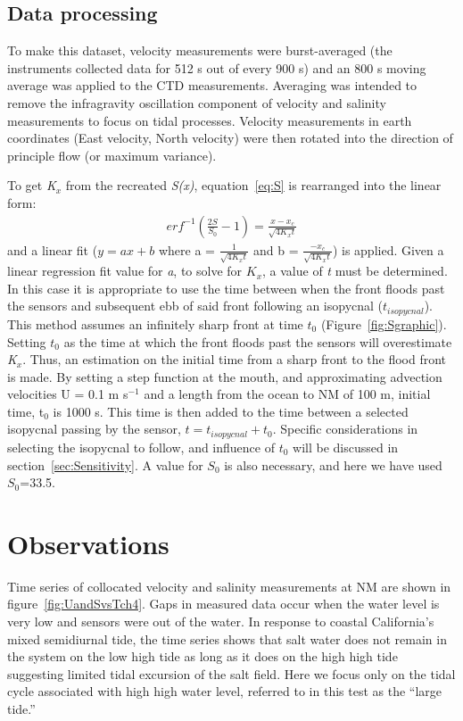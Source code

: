 \subsection{Data processing} \label{ssec:DataProcessing}
To make this dataset, velocity measurements were burst-averaged (the instruments collected data for 512 s out of every 900 s) and an 800 s moving average was applied to the CTD measurements.  Averaging was intended to remove the infragravity oscillation component of velocity and salinity measurements to focus on tidal processes. Velocity measurements in earth coordinates (East velocity, North velocity) were then rotated into the direction of principle flow (or maximum variance). 

To get \emph{K$_x$} from the recreated \emph{S(x)}, equation~\ref{eq:S} is rearranged into the linear form:
\begin{eqnarray}
erf^{-1}\left(\frac{2S}{S_0}-1\right) = \frac{x-x_c}{\sqrt{4K_xt}} \label{eq:linfitS}
\end{eqnarray}
and a linear fit ($y = ax + b$ where a = $\frac{1}{\sqrt{4K_xt}}$ and b = $\frac{-x_c}{\sqrt{4K_xt}}$) is applied. Given a linear regression fit value for \emph{a}, to solve for $K_x$, a value of \emph{t} must be determined. In this case it is appropriate to use the time between when the front floods past the sensors and subsequent ebb of said front following an isopycnal ($t_{isopycnal}$). This method assumes an infinitely sharp front at time $t_0$ (Figure~\ref{fig:Sgraphic}). Setting $t_0$ as the time at which the front floods past the sensors will overestimate \emph{K$_x$}. Thus, an estimation on the initial time from a sharp front to the flood front is made. By setting a step function at the mouth, and approximating advection velocities U = 0.1 m s$^{-1}$ and a length from the ocean to NM of 100 m, initial time, t$_0$ is 1000 s. This time is then added to the time between a selected isopycnal passing by the sensor, $t = t_{isopycnal}+t_0$. Specific considerations in selecting the isopycnal to follow, and influence of $t_0$ will be discussed in section~\ref{sec:Sensitivity}. A value for $S_0$ is also necessary, and here we have used $S_0$=33.5.



\section{Observations} \label{sec:ObsCh4}
Time series of collocated velocity and salinity measurements at NM are shown in figure~\ref{fig:UandSvsTch4}. Gaps in measured data occur when the water level is very low and sensors were out of the water. In response to coastal California's mixed semidiurnal tide, the time series shows that salt water does not remain in the system on the low high tide  as long as it does on the high high tide suggesting limited tidal excursion of the salt field. Here we focus only on the tidal cycle associated with high high water level, referred to in this test as the \textquotedblleft large tide.''

